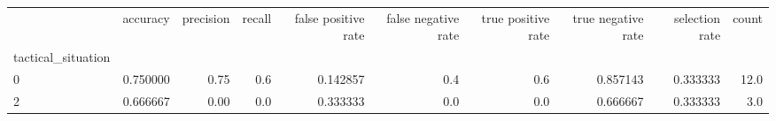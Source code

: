 \begin{tabular}{lrrrrrrrrr}
\toprule
{} &  accuracy &  precision &  recall &  false positive rate &  false negative rate &  true positive rate &  true negative rate &  selection rate &  count \\
tactical\_situation &           &            &         &                      &                      &                     &                     &                 &        \\
\midrule
0                  &  0.750000 &       0.75 &     0.6 &             0.142857 &                  0.4 &                 0.6 &            0.857143 &        0.333333 &   12.0 \\
2                  &  0.666667 &       0.00 &     0.0 &             0.333333 &                  0.0 &                 0.0 &            0.666667 &        0.333333 &    3.0 \\
\bottomrule
\end{tabular}
